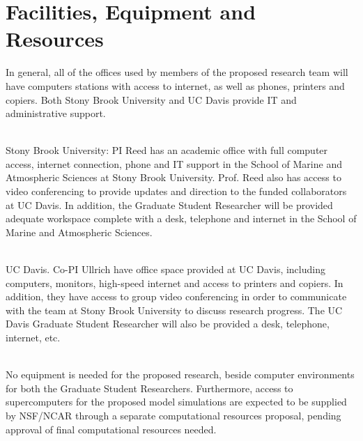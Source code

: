 \documentclass[11pt]{article}
\begin{document}
\setcounter{section}{2}

\appendix

\setcounter{section}{8}

\section{Facilities, Equipment and Resources}

In general, all of the offices used by members of the proposed research team will have computers stations with access to internet, as well as phones, printers and copiers. Both Stony Brook University and UC Davis provide IT and administrative support.

\ \\

\noindent Stony Brook University: PI Reed has an academic office with full computer access, internet connection, phone and IT support in the School of Marine and Atmospheric Sciences at Stony Brook University. Prof. Reed also has access to video conferencing to provide updates and direction to the funded collaborators at UC Davis. In addition, the Graduate Student Researcher will be provided adequate workspace complete with a desk, telephone and internet in the School of Marine and Atmospheric Sciences. 

\ \\

\noindent UC Davis. Co-PI Ullrich have office space provided at UC Davis, including computers, monitors, high-speed internet and access to printers and copiers. In addition, they have access to group video conferencing in order to communicate with the team at Stony Brook University to discuss research progress.  The UC Davis Graduate Student Researcher will also be provided a desk, telephone, internet, etc.

\ \\

\noindent No equipment is needed for the proposed research, beside computer environments for both the Graduate Student Researchers. Furthermore, access to supercomputers for the proposed model simulations are expected to be supplied by NSF/NCAR through a separate computational resources proposal, pending approval of final computational resources needed.
\end{document}
